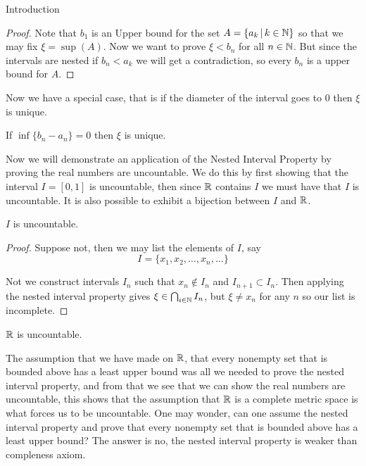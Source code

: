 \begin{chapter}{Introduction}
    
    \begin{proof}
        Note that $b_1$ is an Upper bound for the set $A = \{a_k \, | \, k \in \mathbb{N}\}$ so that we may fix $\xi = \sup(A)$. Now 
        we want to prove $\xi < b_n$ for all $n \in \mathbb{N}$. But since the intervals are nested if $b_n < a_k$ we will get a contradiction, so every $b_n$ is a upper bound 
        for $A$. 
    \end{proof}

    Now we have a special case, that is if the diameter of the interval goes to $0$ then $\xi$ is unique. 

    
    \begin{cor}
        If $\inf\{b_n - a_n\} = 0$ then $\xi$ is unique.
    \end{cor}


    Now we will demonstrate an application of the Nested Interval Property by proving the real numbers are uncountable. We do this by first 
    showing that the interval $I = [0,1]$ is uncountable, then since $\mathbb{R}$ contains $I$ we must have that $I$ is uncountable. It is also possible to 
    exhibit a bijection between $I$ and $\mathbb{R}$. 

    
    \begin{thm}
        $I$ is uncountable.
    \end{thm}

    
    \begin{proof}

        Suppose not, then we may list the elements of $I$, say 
        \[I = \{x_1, x_2, \dots , x_n, \dots \}\]

        Not we construct intervals $I_n$ such that $x_n \notin I_n$ and $I_{n+1} \subset I_n$. Then 
        applying the nested interval property gives $\xi \in \bigcap_{i \in \mathbb{N}} I_n$, but $\xi \neq x_n$ for any $n$ so 
        our list is incomplete.         
    \end{proof}

    
    \begin{cor}
        $\mathbb{R}$ is uncountable.
    \end{cor}

    The assumption that we have made on $\mathbb{R}$, that every nonempty set that is bounded above has a least upper bound was all we needed 
    to prove the nested interval property, and from that we see that we can show the real numbers are uncountable, this shows that the assumption 
    that $\mathbb{R}$ is a complete metric space is what forces us to be uncountable. 
    One may wonder, can one assume the nested interval property and prove that every nonempty set that is bounded above has a least upper bound? 
    The answer is no, the nested interval property is weaker than compleness axiom. 


    

\end{chapter}